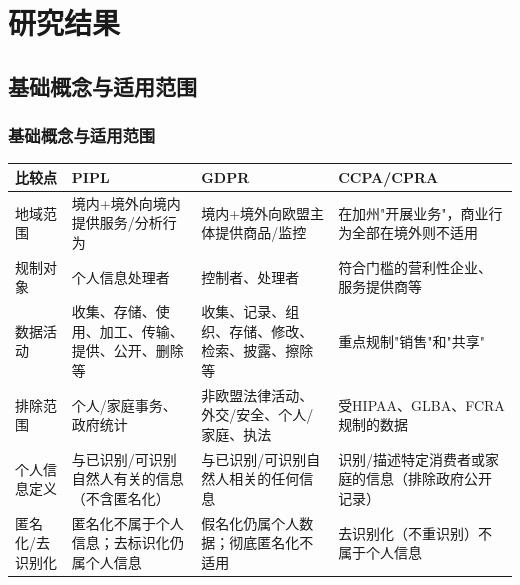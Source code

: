 \documentclass[AutoFakeBold,AutoFakeSlant]{beamer}
\begin{document}

\section{研究结果}

\subsection{基础概念与适用范围}
\begin{frame}
	\frametitle{基础概念与适用范围}
	\scriptsize
	\begin{tabularx}{\textwidth}{X|X|X|X}
		\toprule
		\textbf{比较点} & \textbf{PIPL} & \textbf{GDPR} & \textbf{CCPA/CPRA} \\
		\midrule
		地域范围 & 境内+境外向境内提供服务/分析行为 & 境内+境外向欧盟主体提供商品/监控 & 在加州"开展业务"，商业行为全部在境外则不适用 \\
		规制对象 & 个人信息处理者 & 控制者、处理者 & 符合门槛的营利性企业、服务提供商等 \\
		数据活动 & 收集、存储、使用、加工、传输、提供、公开、删除等 & 收集、记录、组织、存储、修改、检索、披露、擦除等 & 重点规制"销售"和"共享" \\
		排除范围 & 个人/家庭事务、政府统计 & 非欧盟法律活动、外交/安全、个人/家庭、执法 & 受HIPAA、GLBA、FCRA规制的数据 \\
		个人信息定义 & 与已识别/可识别自然人有关的信息（不含匿名化） & 与已识别/可识别自然人相关的任何信息 & 识别/描述特定消费者或家庭的信息（排除政府公开记录） \\
		匿名化/去识别化 & 匿名化不属于个人信息；去标识化仍属个人信息 & 假名化仍属个人数据；彻底匿名化不适用 & 去识别化（不重识别）不属于个人信息 \\
		\bottomrule
	\end{tabularx}
\end{frame}
\end{document}
